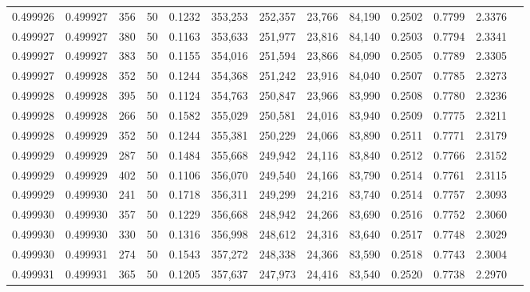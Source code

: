 \begin{tabular}{rrrrrrrrrrrrr}
0.499926 & 0.499927 &   356 &  50 &                                     0.1232 & 353,253 & 252,357 &  23,766 &  84,190 & 0.2502 & 0.7799 & 2.3376 \\
0.499927 & 0.499927 &   380 &  50 &                                     0.1163 & 353,633 & 251,977 &  23,816 &  84,140 & 0.2503 & 0.7794 & 2.3341 \\
0.499927 & 0.499927 &   383 &  50 &                                     0.1155 & 354,016 & 251,594 &  23,866 &  84,090 & 0.2505 & 0.7789 & 2.3305 \\
0.499927 & 0.499928 &   352 &  50 &                                     0.1244 & 354,368 & 251,242 &  23,916 &  84,040 & 0.2507 & 0.7785 & 2.3273 \\
0.499928 & 0.499928 &   395 &  50 &                                     0.1124 & 354,763 & 250,847 &  23,966 &  83,990 & 0.2508 & 0.7780 & 2.3236 \\
0.499928 & 0.499928 &   266 &  50 &                                     0.1582 & 355,029 & 250,581 &  24,016 &  83,940 & 0.2509 & 0.7775 & 2.3211 \\
0.499928 & 0.499929 &   352 &  50 &                                     0.1244 & 355,381 & 250,229 &  24,066 &  83,890 & 0.2511 & 0.7771 & 2.3179 \\
0.499929 & 0.499929 &   287 &  50 &                                     0.1484 & 355,668 & 249,942 &  24,116 &  83,840 & 0.2512 & 0.7766 & 2.3152 \\
0.499929 & 0.499929 &   402 &  50 &                                     0.1106 & 356,070 & 249,540 &  24,166 &  83,790 & 0.2514 & 0.7761 & 2.3115 \\
0.499929 & 0.499930 &   241 &  50 &                                     0.1718 & 356,311 & 249,299 &  24,216 &  83,740 & 0.2514 & 0.7757 & 2.3093 \\
0.499930 & 0.499930 &   357 &  50 &                                     0.1229 & 356,668 & 248,942 &  24,266 &  83,690 & 0.2516 & 0.7752 & 2.3060 \\
0.499930 & 0.499930 &   330 &  50 &                                     0.1316 & 356,998 & 248,612 &  24,316 &  83,640 & 0.2517 & 0.7748 & 2.3029 \\
0.499930 & 0.499931 &   274 &  50 &                                     0.1543 & 357,272 & 248,338 &  24,366 &  83,590 & 0.2518 & 0.7743 & 2.3004 \\
0.499931 & 0.499931 &   365 &  50 &                                     0.1205 & 357,637 & 247,973 &  24,416 &  83,540 & 0.2520 & 0.7738 & 2.2970 \\

\end{tabular}

